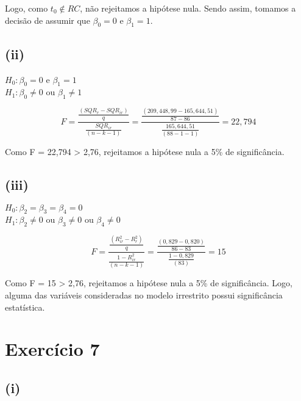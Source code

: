 \documentclass[hidelinks,11pt]{book}
\theoremstyle{definition}
\begin{document}
Logo, como $t_0 \not \in RC$, não rejeitamos a hipótese nula. Sendo assim, tomamos a decisão de assumir que $\beta_0 = 0$ e $\beta_1 = 1$.

\subsection*{(ii)}

\begin{center}
	$H_0 : \beta_{0} = 0$ e $\beta_{1} = 1$\\
	$H_1 : \beta_{0} \not = 0$ ou $\beta_{1} \not = 1$
\end{center}

\begin{displaymath}
	F = \frac{\frac{(SQR_r - SQR_{ir})}{q}}    {\frac{SQR_{ir}}{(n-k-1)}} = \frac{\frac{(209,448,99 - 165,644,51)}{87-86}}    {\frac{165,644,51}{(88-1-1)}} = 22,794
\end{displaymath}

Como F = 22,794 > 2,76, rejeitamos a hipótese nula a 5\% de significância.\\

\subsection*{(iii)}

\begin{center}
	$H_0 : \beta_{2} =  \beta_3 = \beta_4 = 0$\\
	$H_1 : \beta_{2} \not = 0$ ou $\beta_{3} \not = 0$ ou $\beta_{4} \not = 0$
\end{center}

\begin{displaymath}
	F = \frac{\frac{(R^{2}_{ir} - R^{2}_{r})}{q}}    {\frac{1 - R^{2}_{ir}}{(n-k-1)}} = \frac{\frac{(0,829 - 0,820)}{86 -83}}    {\frac{1 - 0,829}{(83)}} = 15
\end{displaymath}

Como F = 15 > 2,76, rejeitamos a hipótese nula a 5\% de significância. Logo, alguma das variáveis consideradas no modelo irrestrito possui significância estatística.


\section*{Exercício 7}

\subsection*{(i)}
\end{document}
